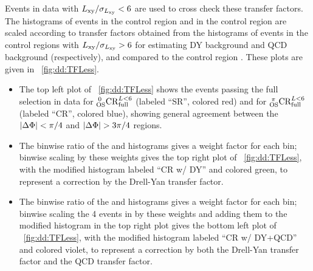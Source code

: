 Events in data with $\LxySig < 6$ are used to cross check these transfer factors.
The histograms of events in the control region  and in the control region  are scaled according to transfer factors obtained from the histograms of events in the control regions with $\LxySig > 6$ for estimating DY background and QCD background (respectively), and compared to the control region .
These plots are given in \Fig~\ref{fig:dd:TFLess}.
\begin{itemize}
  \item The top left plot of \Fig~\ref{fig:dd:TFLess} shows the events passing the full selection in data for $\CR{\Full}{<6}{0}$ (labeled ``SR'', colored red) and for $\CR{\Full}{<6}{\pi}$ (labeled ``CR'', colored blue), showing general agreement between the $\DeltaPhi < \pi/4$ and $\DeltaPhi > 3\pi/4$ regions.
  \item The binwise ratio of the  and  histograms gives a weight factor for each \LxySig bin; binwise scaling  by these weights gives the top right plot of \Fig~\ref{fig:dd:TFLess}, with the modified histogram labeled ``CR w/ DY'' and colored green, to represent a correction by the Drell-Yan transfer factor.
  \item The binwise ratio of the  and  histograms gives a weight factor for each \LxySig bin; binwise scaling the 4 events in  by these weights and adding them to the modified  histogram in the top right plot gives the bottom left plot of \Fig~\ref{fig:dd:TFLess}, with the modified histogram labeled ``CR w/ DY+QCD'' and colored violet, to represent a correction by both the Drell-Yan transfer factor and the QCD transfer factor.
\end{itemize}

